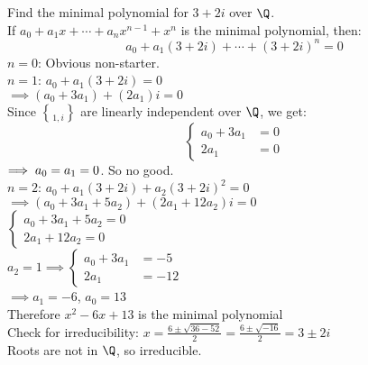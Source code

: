 \eg Find the minimal polynomial for $3+2i$ over $\Q$. \\
\ans If $a_0+a_1x+\dotsb+a_nx^{n-1}+x^n$ is the minimal polynomial, then:
\[ a_0 + a_1(3+2i) + \dotsb + (3+2i)^n = 0 \]
$n=0$: Obvious non-starter. \\
$n=1$: $a_0+a_1(3+2i)=0$ \\
$\implies(a_0+3a_1)+(2a_1)i=0$ \\
Since $\brace{1,i}$ are linearly independent over $\Q$, we get:
\[ \left\{ \begin{aligned}
a_0 + 3 a_1 &= 0 \\
2 a_1 &= 0
\end{aligned} \right. \]
$\negthickspace\implies a_0=a_1=0$.  So no good. \\
$n=2$: $a_0+a_1(3+2i)+a_2(3+2i)^2=0$ \\
$\implies(a_0+3a_1+5a_2)+(2a_1+12a_2)i=0$ \\
$\left\{\begin{aligned}
a_0 + 3a_1 + 5a_2 = 0 \\
2 a_1 + 12a_2 = 0
\end{aligned}\right.$ \\
$a_2=1\implies\left\{\begin{aligned}a_0+3a_1&=-5\\2a_1&=-12\end{aligned}\right.$ \\
$\implies a_1=-6$, $a_0=13$ \\
Therefore $x^2-6x+13$ is the minimal polynomial \\
Check for irreducibility: $x=\frac{6\pm\sqrt{36-52}}{2}=\frac{6\pm\sqrt{-16}}{2}=3\pm2i$ \\
Roots are not in $\Q$, so irreducible.
